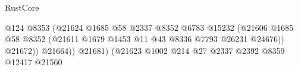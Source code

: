 \begin{lexlean}{RustCore}
\begin{coremodule}
                                                                      @124
                                                                      @8353
                                                                      (@21624
                                                                        @1685
                                                                        @58
                                                                        @2337
                                                                        @8352
                                                                        @6783
                                                                        @15232
                                                                        (@21606
                                                                          @1685
                                                                          @58
                                                                          @8352
                                                                          (@21611
                                                                            @1679
                                                                            @1453
                                                                            @11
                                                                            @43
                                                                            @8336
                                                                            @7793
                                                                            @26231
                                                                            @24676))
                                                                        @21672))
                                                                    @21664))
                                                                @21681)
                                                              (@21623
                                                                @1002
                                                                @214
                                                                @27
                                                                @2337
                                                                @2392
                                                                @8359
                                                                @12417
                                                                @21560

\end{coremodule}
\end{lexlean}

